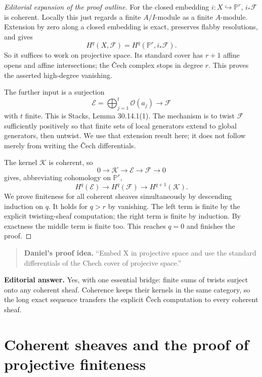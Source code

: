 \begin{proof}[Editorial expansion of the
proof outline]
For the closed embedding
$i:X\hookrightarrow\mathbb{P}^r$,
$i_*\mathcal{F}$ is coherent. Locally this
just regards a finite $A/I$-module as a
finite $A$-module. Extension by zero along
a closed embedding is exact, preserves
flabby resolutions, and gives
$$
H^q(X,\mathcal{F})
=H^q(\mathbb{P}^r,i_*\mathcal{F}).
$$
So it suffices to work on projective space.
Its standard cover has $r+1$ affine opens
and affine intersections; the \v{C}ech
complex stops in degree $r$. This proves
the asserted high-degree vanishing.

The further input is a surjection
$$
\mathcal{E}=\bigoplus_{j=1}^t
\mathcal{O}(a_j)\longrightarrow\mathcal{F}
$$
with $t$ finite. This is Stacks, Lemma
30.14.1(1). The mechanism is to twist
$\mathcal{F}$ sufficiently positively so
that finite sets of local generators
extend to global generators, then untwist.
We use that extension result here; it does
not follow merely from writing the
\v{C}ech differentials.

The kernel $\mathcal{K}$ is coherent, so
$$
0\longrightarrow\mathcal{K}
\longrightarrow\mathcal{E}
\longrightarrow\mathcal{F}
\longrightarrow0
$$
gives, abbreviating cohomology on
$\mathbb{P}^r$,
$$
H^q(\mathcal{E})\longrightarrow
H^q(\mathcal{F})\longrightarrow
H^{q+1}(\mathcal{K}).
$$
We prove finiteness for all coherent
sheaves simultaneously by descending
induction on $q$. It holds for $q>r$ by
vanishing. The left term is finite by the
explicit twisting-sheaf computation; the
right term is finite by induction. By
exactness the middle term is finite too.
This reaches $q=0$ and finishes the proof.
\end{proof}

\begin{quote}
\textbf{Daniel's proof idea.}
``Embed X in projective space and use the
 standard differentials of the Chech cover
 of projecive space.''
\end{quote}

\noindent
\textbf{Editorial answer.} Yes, with one
essential bridge: finite sums of twists
surject onto any coherent sheaf. Coherence
keeps their kernels in the same category,
so the long exact sequence transfers the
explicit \v{C}ech computation to every
coherent sheaf.

\section{Coherent sheaves and the proof of
projective finiteness}
\label{section-jethro-2026-11-18}

